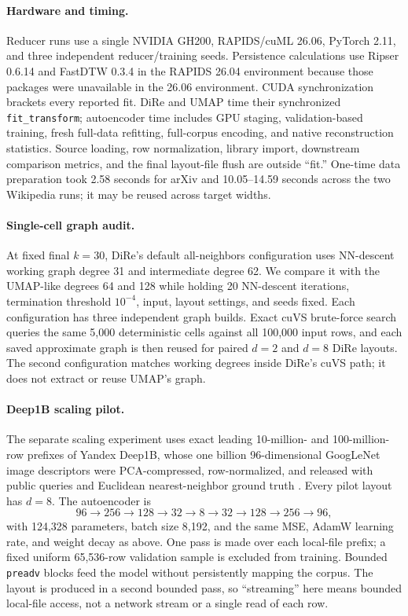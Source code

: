 \documentclass[10pt]{article}
\begin{document}
\paragraph{Hardware and timing.}
Reducer runs use a single NVIDIA GH200, RAPIDS/cuML 26.06, PyTorch 2.11, and three
independent reducer/training seeds.  Persistence calculations use Ripser 0.6.14 and
FastDTW 0.3.4 in the RAPIDS 26.04 environment because those packages were unavailable in
the 26.06 environment.  CUDA synchronization brackets every reported fit.  DiRe and UMAP
time their synchronized \texttt{fit\_transform}; autoencoder time includes GPU staging,
validation-based training, fresh full-data refitting, full-corpus encoding, and native
reconstruction statistics.  Source loading, row normalization, library import, downstream
comparison metrics, and the final layout-file flush are outside ``fit.''  One-time data
preparation took 2.58 seconds for arXiv and 10.05--14.59 seconds across the two Wikipedia
runs; it may be reused across target widths.

\paragraph{Single-cell graph audit.}
At fixed final $k=30$, DiRe's default all-neighbors configuration uses NN-descent
working graph degree 31 and intermediate degree 62.  We compare it with the
UMAP-like degrees 64 and 128 while holding 20 NN-descent iterations, termination
threshold $10^{-4}$, input, layout settings, and seeds fixed.  Each configuration has
three independent graph builds.  Exact cuVS brute-force search queries the same 5,000
deterministic cells against all 100,000 input rows, and each saved approximate graph is
then reused for paired $d=2$ and $d=8$ DiRe layouts.  The second configuration matches
working degrees inside DiRe's cuVS path; it does not extract or reuse UMAP's graph.

\paragraph{Deep1B scaling pilot.}
The separate scaling experiment uses exact leading 10-million- and 100-million-row
prefixes of Yandex Deep1B, whose one billion 96-dimensional GoogLeNet image descriptors
were PCA-compressed, row-normalized, and released with public queries and Euclidean
nearest-neighbor ground truth \cite{babenko2016,yandexdeep1b}.  Every pilot layout has
$d=8$.  The autoencoder is
\[
96\!\to\!256\!\to\!128\!\to\!32\!\to\!8\!\to\!32\!\to\!128\!\to\!256\!\to\!96,
\]
with 124,328 parameters, batch size 8,192, and the same MSE, AdamW learning rate, and
weight decay as above.  One pass is made over each local-file prefix; a fixed uniform
65,536-row validation sample is excluded from training.  Bounded \texttt{preadv} blocks
feed the model without persistently mapping the corpus.  The layout is produced in a
second bounded pass, so ``streaming'' here means bounded local-file access, not a network
stream or a single read of each row.
\end{document}
